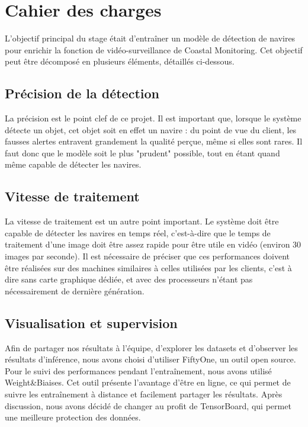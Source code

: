 \chapter{Cahier des charges}

L'objectif principal du stage était d'entraîner un modèle de détection
de navires pour enrichir la fonction de vidéo-surveillance de Coastal Monitoring.
Cet objectif peut être décomposé en plusieurs éléments, détaillés ci-dessous.

\section{Précision de la détection}

La précision est le point clef de ce projet. Il est important que, lorsque le
système détecte un objet, cet objet soit en effet un navire : du point de vue du client,
les fausses alertes entravent grandement la qualité perçue, même si elles sont rares.
Il faut donc que le modèle soit le plus "prudent" possible, tout en étant quand même
capable de détecter les navires.

\section{Vitesse de traitement}

La vitesse de traitement est un autre point important. Le système doit être capable
de détecter les navires en temps réel, c'est-à-dire que le temps de traitement d'une image
doit être assez rapide pour être utile en vidéo (environ 30 images par seconde).
Il est nécessaire de préciser que ces performances doivent être réalisées sur
des machines similaires à celles utilisées par les clients, c'est à dire sans
carte graphique dédiée, et avec des processeurs n'étant pas nécessairement de
dernière génération.

\section{Visualisation et supervision}

Afin de partager nos résultats à l'équipe, d'explorer les datasets et d'observer les résultats
d'inférence, nous avons choisi d'utiliser FiftyOne, un outil open source.\\ 

Pour le suivi des performances pendant l'entraînement, nous avons utilisé Weight\&Biaises. 
Cet outil présente l'avantage d'être en ligne, ce qui permet de suivre les entraînement 
à distance et facilement partager les résultats. Après discussion, nous avons décidé de 
changer au profit de TensorBoard, qui permet une meilleure protection des données.

